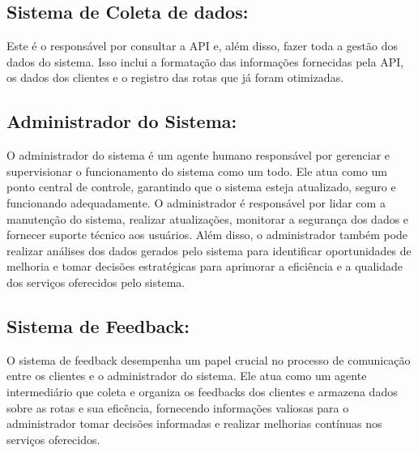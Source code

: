 \subsection{Sistema de Coleta de dados:} 
Este é o responsável por consultar a API e, além disso, fazer toda a gestão dos dados do sistema. Isso inclui a formatação das informações fornecidas pela API, os dados dos clientes e o registro das rotas que já foram otimizadas.

\subsection{Administrador do Sistema:} 
O administrador do sistema é um agente humano responsável por gerenciar e supervisionar o funcionamento do sistema como um todo. Ele atua como um ponto central de controle, garantindo que o sistema esteja atualizado, seguro e funcionando adequadamente. O administrador é responsável por lidar com a manutenção do sistema, realizar atualizações, monitorar a segurança dos dados e fornecer suporte técnico aos usuários. Além disso, o administrador também pode realizar análises dos dados gerados pelo sistema para identificar oportunidades de melhoria e tomar decisões estratégicas para aprimorar a eficiência e a qualidade dos serviços oferecidos pelo sistema.

\subsection{Sistema de Feedback:}

O sistema de feedback desempenha um papel crucial no processo de comunicação entre os clientes e o administrador do sistema. Ele atua como um agente intermediário que coleta e organiza os feedbacks dos clientes e armazena dados sobre as rotas e sua eficência, fornecendo informações valiosas para o administrador tomar decisões informadas e realizar melhorias contínuas nos serviços oferecidos.